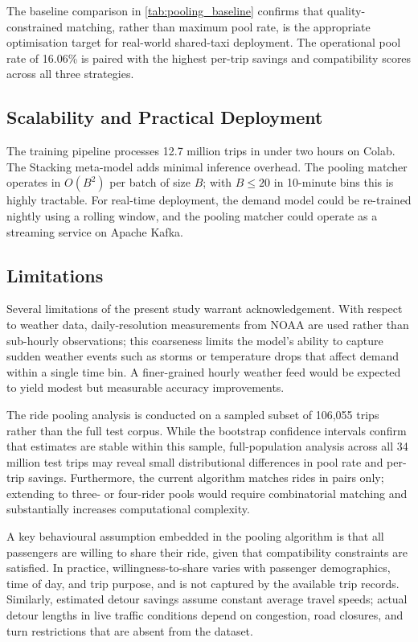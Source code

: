 \documentclass[a4paper,fleqn]{cas-dc}
\begin{document}
The baseline comparison in \autoref{tab:pooling_baseline} confirms that quality-constrained matching, rather than maximum pool rate, is the appropriate optimisation target for real-world shared-taxi deployment.  The operational pool rate of 16.06\% is paired with the highest per-trip savings and compatibility scores across all three strategies.

\subsection{Scalability and Practical Deployment}

The training pipeline processes 12.7 million trips in under two hours on Colab.  The Stacking meta-model adds minimal inference overhead.  The pooling matcher operates in $O(B^2)$ per batch of size $B$; with $B \leq 20$ in 10-minute bins this is highly tractable.  For real-time deployment, the demand model could be re-trained nightly using a rolling window, and the pooling matcher could operate as a streaming service on Apache Kafka.

\subsection{Limitations}

Several limitations of the present study warrant acknowledgement.  With respect to weather data, daily-resolution measurements from NOAA are used rather than sub-hourly observations; this coarseness limits the model's ability to capture sudden weather events such as storms or temperature drops that affect demand within a single time bin.  A finer-grained hourly weather feed would be expected to yield modest but measurable accuracy improvements.

The ride pooling analysis is conducted on a sampled subset of 106,055 trips rather than the full test corpus.  While the bootstrap confidence intervals confirm that estimates are stable within this sample, full-population analysis across all 34 million test trips may reveal small distributional differences in pool rate and per-trip savings.  Furthermore, the current algorithm matches rides in pairs only; extending to three- or four-rider pools would require combinatorial matching and substantially increases computational complexity.

A key behavioural assumption embedded in the pooling algorithm is that all passengers are willing to share their ride, given that compatibility constraints are satisfied.  In practice, willingness-to-share varies with passenger demographics, time of day, and trip purpose, and is not captured by the available trip records.  Similarly, estimated detour savings assume constant average travel speeds; actual detour lengths in live traffic conditions depend on congestion, road closures, and turn restrictions that are absent from the dataset.
\end{document}
